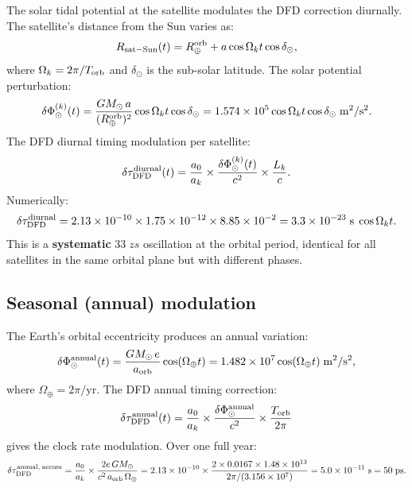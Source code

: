 \documentclass[aps,prd,twocolumn,superscriptaddress,nofootinbib,longbibliography]{revtex4-2}
\begin{document}
The solar tidal potential at the satellite modulates the DFD correction
diurnally. The satellite's distance from the Sun varies as:
\begin{equation}
R_{\rm sat-Sun}(t) = R_\oplus^{\rm orb} + a\cos\Omega_k t\cos\delta_\odot,
\end{equation}
where $\Omega_k = 2\pi/T_{\rm orb}$ and $\delta_\odot$ is the
sub-solar latitude. The solar potential perturbation:
\begin{equation}
\delta\Phi_\odot^{(k)}(t) = \frac{GM_\odot\,a}{(R_\oplus^{\rm orb})^2}\cos\Omega_k t\cos\delta_\odot
= 1.574\times10^5\cos\Omega_k t\cos\delta_\odot\;\si{m^2/s^2}.
\end{equation}
The DFD diurnal timing modulation per satellite:
\begin{equation}\label{eq:diurnal-mod}
\delta\tau_{\rm DFD}^{\rm diurnal}(t) = \frac{a_0}{a_k}\times
\frac{\delta\Phi_\odot^{(k)}(t)}{c^2}\times\frac{L_k}{c}.
\end{equation}
Numerically:
\begin{equation}
\delta\tau_{\rm DFD}^{\rm diurnal} = 2.13\times10^{-10}\times1.75\times10^{-12}
\times8.85\times10^{-2} = 3.3\times10^{-23}\;\si{s}\;\cos\Omega_k t.
\end{equation}
This is a \textbf{systematic} $33\;\si{zs}$ oscillation at the orbital
period, identical for all satellites in the same orbital plane but with
different phases.

\subsection{Seasonal (annual) modulation}\label{sec:seasonal}

The Earth's orbital eccentricity produces an annual variation:
\begin{equation}
\delta\Phi_\odot^{\rm annual}(t) = \frac{GM_\odot\,e}{a_{\rm orb}}\cos(\Omega_\oplus t)
= 1.482\times10^7\cos(\Omega_\oplus t)\;\si{m^2/s^2},
\end{equation}
where $\Omega_\oplus = 2\pi/\text{yr}$. The DFD annual timing correction:
\begin{equation}\label{eq:annual-mod}
\delta\tau_{\rm DFD}^{\rm annual}(t) = \frac{a_0}{a_k}\times
\frac{\delta\Phi_\odot^{\rm annual}}{c^2}\times\frac{T_{\rm orb}}{2\pi}
\end{equation}
gives the clock rate modulation. Over one full year:
\begin{equation}
\delta\tau_{\rm DFD}^{\rm annual,\;accum} = \frac{a_0}{a_k}\times
\frac{2e\,GM_\odot}{c^2\,a_{\rm orb}\,\Omega_\oplus}
= 2.13\times10^{-10}\times\frac{2\times0.0167\times1.48\times10^{13}}{2\pi/(3.156\times10^7)}
= 5.0\times10^{-11}\;\si{s} = 50\;\si{ps}.
\end{equation}
\end{document}
